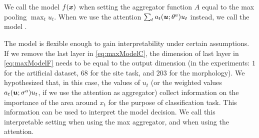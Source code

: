 We call \maxp{} the model $f(\bm{x})$ when setting the aggregator
function $A$ equal to the max pooling $\max_t u_t$. When we use
the attention $\sum_t a_t(\bm{u};\theta^a) u_t$ instead, we call the
model \softmax{}.

The model is flexible enough to gain interpretability under certain
assumptions. If we remove the last layer in \eqref{eq:maxModelC},
the dimension of last layer in \eqref{eq:maxModelF}
needs to be equal to the
output dimension (in the experiments: $1$ for the artificial dataset,
$68$ for the site task, and $203$ for the 
morphology).
We hypothesized that, in this case, the values of
$u_t$ (or the weighted values $a_t(\bm{u};\sigma^a)u_t$, if we use the
attention as aggregator) collect information on the importance of the
area 
around $x_t$ for the purpose of classification task. This
information can be
used to interpret the model decision. We call \maxi{} this
interpretable setting when using the max aggregator, and \softmaxi{}
when using the attention.
